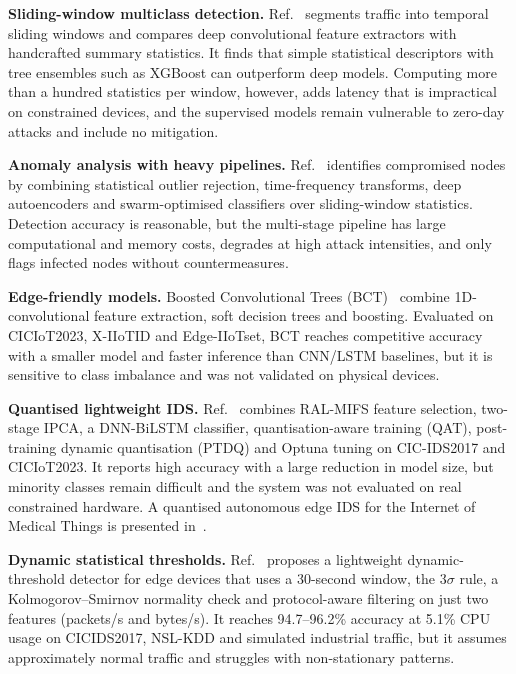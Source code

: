 \documentclass[]{interact}
\theoremstyle{plain}
\theoremstyle{definition}
\begin{document}
\textbf{Sliding-window multiclass detection.} Ref.~\citep{lit_hybrid} segments traffic into temporal sliding windows and compares deep convolutional feature extractors with handcrafted summary statistics. It finds that simple statistical descriptors with tree ensembles such as XGBoost can outperform deep models. Computing more than a hundred statistics per window, however, adds latency that is impractical on constrained devices, and the supervised models remain vulnerable to zero-day attacks and include no mitigation.

\textbf{Anomaly analysis with heavy pipelines.} Ref.~\citep{lit_wireless} identifies compromised nodes by combining statistical outlier rejection, time-frequency transforms, deep autoencoders and swarm-optimised classifiers over sliding-window statistics. Detection accuracy is reasonable, but the multi-stage pipeline has large computational and memory costs, degrades at high attack intensities, and only flags infected nodes without countermeasures.

\textbf{Edge-friendly models.} Boosted Convolutional Trees (BCT)~\citep{lit_bct} combine 1D-convolutional feature extraction, soft decision trees and boosting. Evaluated on CICIoT2023, X-IIoTID and Edge-IIoTset, BCT reaches competitive accuracy with a smaller model and faster inference than CNN/LSTM baselines, but it is sensitive to class imbalance and was not validated on physical devices.

\textbf{Quantised lightweight IDS.} Ref.~\citep{misrak2025} combines RAL-MIFS feature selection, two-stage IPCA, a DNN-BiLSTM classifier, quantisation-aware training (QAT), post-training dynamic quantisation (PTDQ) and Optuna tuning on CIC-IDS2017 and CICIoT2023. It reports high accuracy with a large reduction in model size, but minority classes remain difficult and the system was not evaluated on real constrained hardware. A quantised autonomous edge IDS for the Internet of Medical Things is presented in~\citep{mondal2026}.

\textbf{Dynamic statistical thresholds.} Ref.~\citep{lit_adaptive} proposes a lightweight dynamic-threshold detector for edge devices that uses a 30-second window, the $3\sigma$ rule, a Kolmogorov--Smirnov normality check and protocol-aware filtering on just two features (packets/s and bytes/s). It reaches 94.7--96.2\% accuracy at 5.1\% CPU usage on CICIDS2017, NSL-KDD and simulated industrial traffic, but it assumes approximately normal traffic and struggles with non-stationary patterns.
\end{document}
